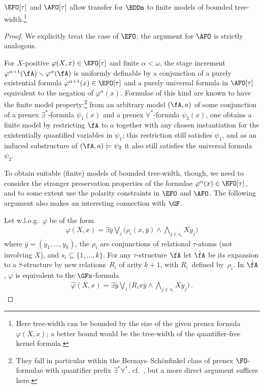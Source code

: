 \documentclass{LMCS}
\begin{document}
\begin{lem}
$\EFO[\tau]$ and $\AFO[\tau]$ allow transfer for $\BDDm$ to
finite models of bounded tree-width.\footnote{Here tree-width can be bounded by
the size of the given prenex formula $\varphi(X,x)$\?; a better bound
would be the tree-width of the quantifier-free kernel formula.}
\end{lem}
\begin{proof}
We explicitly treat the case of $\EFO$\?; the argument for $\AFO$ is
strictly analogous.

For $X$-positive $\varphi(X,x) \in \EFO[\tau]$ and finite $\alpha < \omega$,
the stage increment
$\varphi^{\alpha+1}(\fA) \smallsetminus \varphi^\alpha(\fA)$
is uniformly definable by a conjunction of a purely existential
formula
$\varphi^{\alpha+1}(x) \in \EFO[\tau]$
and a purely universal
formula in $\AFO[\tau]$ equivalent to the negation of $\varphi^\alpha(x)$.
Formulae of this kind are known to have the finite
model property\?:\footnote{They fall in particular within
the Bernays--Sch\"onfinkel class of prenex $\FO$-formulae
with quantifier prefix $\exists^\ast\forall^\ast$, cf.~\cite{BGG},
but a more direct argument suffices here.}
from an arbitrary model $(\fA,a)$ of some conjunction of a prenex
$\exists^\ast$-formula $\psi_1(x)$ and a prenex
$\forall^\ast$-formula $\psi_2(x)$, one obtains a finite model
by restricting $\fA$ to $a$ together with any chosen instantiation for the
existentially quantified variables in $\psi_1$\?; this restriction
still satisfies $\psi_1$, and as an induced substructure
of $(\fA,a) \models \psi_2$ it also still satisfies the universal
formula~$\psi_2$.

To obtain suitable (finite) models of bounded tree-width,
though, we need to consider the stronger preservation properties of
the formulae $\varphi^{\alpha}(x) \in \EFO[\tau]$,
and to some extent use the polarity constraints in $\EFO$ and $\AFO$.
The following argument also makes an interesting connection
with $\GF$.

Let w.l.o.g.\ $\varphi$ be of the form
\begin{align*}
  \varphi(X,x) =
  \exists \bar{y} \bigvee_i
  \bigl( \rho_i(x,\bar{y}) \wedge \bigwedge_{j \in s_i} X y_j \bigr)
\end{align*}
where $\bar{y} = (y_1,\dots, y_k)$,
the $\rho_i$ are conjunctions of relational $\tau$-atoms
(not involving $X$), and $s_i \subseteq \{ 1,\dots, k \}$.
For any $\tau$-structure $\fA$ let $\hat{\fA}$ be its expansion to
a $\hat{\tau}$-structure by new relations~$R_i$
of arity $k+1$, with $R_i$~defined by~$\rho_i$.
In $\hat{\fA}$, $\varphi$ is equivalent to the $\GFs$-formula
\begin{align*}
  \hat{\varphi}(X,x) =
  \exists \bar{y} \bigvee_i
  \bigl( R_i x\bar{y} \wedge \bigwedge_{j \in s_i} X y_j \bigr)\,.
\end{align*}


\end{proof}
\end{document}

